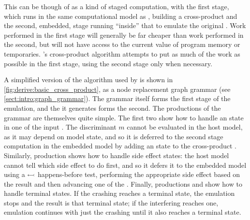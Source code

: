 This can be though of as a kind of staged computation, with the first
stage, which runs in the same computational model as {\technique},
building a cross-product {\StateMachine} and the second, embedded,
stage running ``inside'' that {\StateMachine} to emulate the original
{\StateMachines}.  Work performed in the first stage will generally be
far cheaper than work performed in the second, but will not have
access to the current value of program memory or {\StateMachine}
temporaries.  {\Technique}'s cross-product algorithm attempts to put
as much of the work as possible in the first stage, using the second
stage only when necessary.

A simplified version of the algorithm used by {\technique} is shown in
\autoref{fig:derive:basic_cross_product}, as a node replacement graph
grammar (see \autoref{sect:intro:graph_grammar}).  The grammar itself
forms the first stage of the emulation, and the {\StateMachine} it
generates forms the second.  The productions of the grammar are
themselves quite simple.  The first two show how to handle an
 state in one of the input {\StateMachines}.  The
discriminant $m$ cannot be evaluated in the host model, as it may
depend on {\StateMachine} model state, and so it is deferred to the
second stage computation in the embedded model by adding an 
state to the cross-product {\StateMachine}.  Similarly, production
 shows how to handle side effect states: the host model
cannot tell which side effect to do first, and so it defers it to the
embedded model using a $\leftarrowtail$ happens-before test,
performing the appropriate side effect based on the result and then
advancing one of the {\StateMachines}.  Finally, productions
 and  show how to handle terminal states.  If
the crashing {\StateMachine} reaches a terminal state, the emulation
stops and the result is that terminal state; if the interfering
{\StateMachine} reaches one, emulation continues with just the
crashing {\StateMachine} until it also reaches a terminal state.

